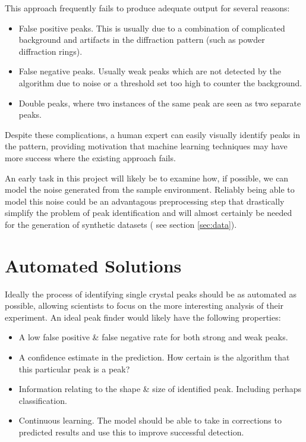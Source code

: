 \documentclass[paper=a4, fontsize=8pt]{scrartcl} \usepackage[T1]{fontenc}
\begin{document}
This approach frequently fails to produce adequate output for several reasons:
\begin{itemize}
\item False positive peaks. This is usually due to a combination 
of complicated background and artifacts in the diffraction pattern (such as 
powder diffraction rings).
\item False negative peaks. Usually weak peaks which are not detected by the 
algorithm due to noise or a threshold set too high to counter the background.
\item Double peaks, where two instances of the same peak are seen as two 
separate peaks.
\end{itemize}

Despite these complications, a human expert can easily visually identify peaks
in the pattern, providing motivation that machine learning techniques may have
more success where the existing approach fails. 

An early task in this project will likely be to examine how, if possible, we can 
model the noise generated from the sample environment. Reliably being able to
model this noise could be an advantagous preprocessing step that
drastically simplify the problem of peak identification
and will almost certainly be needed for the generation of synthetic datasets (
see section \ref{sec:data}).

\section{Automated Solutions} 
Ideally the process of identifying single crystal peaks should be as automated 
as possible, allowing scientists to focus on the more interesting analysis of 
their experiment. An ideal peak finder would likely have the following
properties:

\begin{itemize}
\item A low false positive \& false negative rate for both strong and weak
peaks.
\item A confidence estimate in the prediction. How certain is the algorithm that
this particular peak is a peak?
\item Information relating to the shape \& size of identified peak. Including
perhaps classification.
\item Continuous learning. The model should be able to take in corrections to
predicted results and use this to improve successful detection.
\end{itemize}
\end{document}
